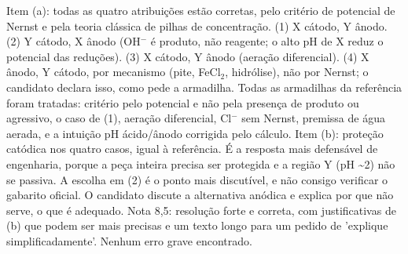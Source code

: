 \documentclass{article}%
\begin{document}
\newline%
Item (a): todas as quatro atribuições estão corretas, pelo critério de potencial de Nernst e pela teoria clássica de pilhas de concentração. (1) X cátodo, Y ânodo. (2) Y cátodo, X ânodo (OH$^{-}$ é produto, não reagente; o alto pH de X reduz o potencial das reduções). (3) X cátodo, Y ânodo (aeração diferencial). (4) X ânodo, Y cátodo, por mecanismo (pite, FeCl$_{2}$, hidrólise), não por Nernst; o candidato declara isso, como pede a armadilha. Todas as armadilhas da referência foram tratadas: critério pelo potencial e não pela presença de produto ou agressivo, o caso de (1), aeração diferencial, Cl$^{-}$ sem Nernst, premissa de água aerada, e a intuição pH ácido/ânodo corrigida pelo cálculo.\newline%
\newline%
Item (b): proteção catódica nos quatro casos, igual à referência. É a resposta mais defensável de engenharia, porque a peça inteira precisa ser protegida e a região Y (pH \textasciitilde{}2) não se passiva. A escolha em (2) é o ponto mais discutível, e não consigo verificar o gabarito oficial. O candidato discute a alternativa anódica e explica por que não serve, o que é adequado.\newline%
\newline%
Nota 8,5: resolução forte e correta, com justificativas de (b) que podem ser mais precisas e um texto longo para um pedido de 'explique simplificadamente'. Nenhum erro grave encontrado.%
\end{document}
